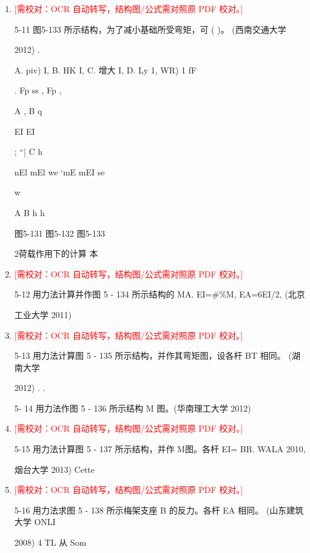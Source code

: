 \documentclass[UTF8,12pt,a4paper,openany]{ctexbook}
\newcommand{\TODO}[1]{\textcolor{red}{[需校对：#1]}}
\begin{document}
\begin{enumerate}[label=\textbf{\arabic*.},leftmargin=2em]
\item \TODO{OCR 自动转写，结构图/公式需对照原 PDF 校对。}\par 5-11 图5-133 所示结构，为了减小基础所受弯矩，可 (   )。 (西南交通大学\par 2012)                        .\par A. piv) I,       B. HK I,       C. 增大 I,      D. Ly 1, WR) 1 fF\par .   Fp   ss      ,   Fp    ,\par A      ,        B                                    q\par EI              EI\par ;                        “|           C                h\par nEl    mEl  we    ‘mE    mEI   se\par w\par A              B    h      h\par 图5-131                  图5-132           图5-133\par 2荷载作用下的计算      本
\item \TODO{OCR 自动转写，结构图/公式需对照原 PDF 校对。}\par 5-12 用力法计算并作图 5 - 134 所示结构的 MA. EI=\#\%M, EA=6EI/2, (北京\par 工业大学 2011)
\item \TODO{OCR 自动转写，结构图/公式需对照原 PDF 校对。}\par 5-13 用力法计算图 5 - 135 所示结构，并作其弯矩图，设各杆 BT 相同。 (湖南大学\par 2012) .    .\par 5- 14 用力法作图 5 - 136 所示结构 M 图。(华南理工大学 2012)
\item \TODO{OCR 自动转写，结构图/公式需对照原 PDF 校对。}\par 5-15 用力法计算图 5 - 137 所示结构，并作 M图。各杆 EI= BR. WALA 2010,\par 烟台大学 2013)     Cette
\item \TODO{OCR 自动转写，结构图/公式需对照原 PDF 校对。}\par 5-16 用力法求图 5 - 138 所示梅架支座 B 的反力。各杆 EA 相同。 (山东建筑大学 ONLI\par 2008)                      4                                   TL 从 Som

\end{enumerate}
\end{document}
